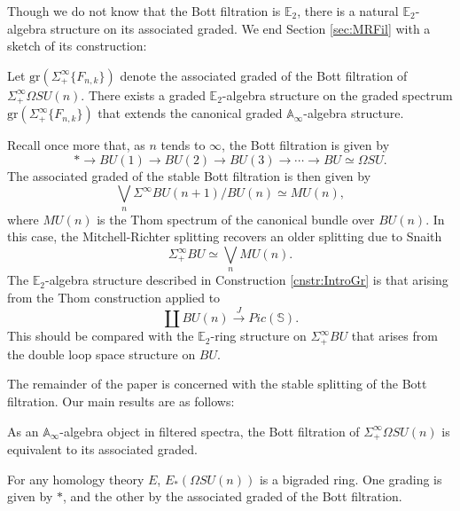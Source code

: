 Though we do not know that the Bott filtration is $\mathbb{E}_2$, there is a natural $\mathbb{E}_2$-algebra structure on its associated graded.  We end Section \ref{sec:MRFil} with a sketch of its construction:

\begin{cnstr} \label{cnstr:IntroGr}
Let $\text{gr}(\Sigma^{\infty}_+\{F_{n,k}\})$ denote the associated graded of the Bott filtration of $\Sigma^{\infty}_+ \Omega SU(n)$.  There exists a graded $\mathbb{E}_2$-algebra structure on the graded spectrum $\text{gr}(\Sigma^{\infty}_+ \{F_{n,k}\})$ that extends the canonical graded $\mathbb{A}_\infty$-algebra structure.
\end{cnstr}

\begin{exm}
Recall once more that, as $n$ tends to $\infty$, the Bott filtration is given by
$$* \longrightarrow BU(1) \longrightarrow BU(2) \longrightarrow BU(3) \longrightarrow \cdots \longrightarrow BU \simeq \Omega SU.$$
The associated graded of the stable Bott filtration is then given by
$$
\bigvee_n \Sigma^{\infty} BU(n+1)/BU(n) \simeq MU(n),
$$
where $MU(n)$ is the Thom spectrum of the canonical bundle over $BU(n)$.  In this case, the Mitchell-Richter splitting recovers an older splitting due to Snaith \cite{SnaithBook}
$$\Sigma^{\infty}_+ BU \simeq \bigvee_n MU(n).$$
The $\mathbb{E}_2$-algebra structure described in Construction \ref{cnstr:IntroGr} is that arising from the Thom construction applied to 
$$\coprod BU(n) \stackrel{J}{\longrightarrow} Pic(\mathbb{S}).$$
This should be compared with the $\mathbb{E}_2$-ring structure on $\Sigma^{\infty}_+ BU$ that arises from the double loop space structure on $BU$.
\end{exm}

The remainder of the paper is concerned with the stable splitting of the Bott filtration.  Our main results are as follows:

\begin{thm} \label{thm:MainAoo}
As an $\mathbb{A}_\infty$-algebra object in filtered spectra, the Bott filtration of $\Sigma^{\infty}_+ \Omega SU(n)$ is equivalent to its associated graded.
\end{thm}

\begin{cor}
For any homology theory $E$, $E_*(\Omega SU(n))$ is a bigraded ring.  One grading is given by $*$, and the other by the associated graded of the Bott filtration.
\end{cor}

